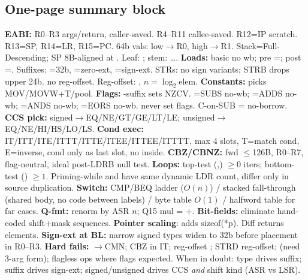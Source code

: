 \subsection{One-page summary block}
\textbf{EABI:} R0--R3 args/return, caller-saved. R4--R11 callee-saved. R12=IP scratch. R13=SP, R14=LR, R15=PC. 64b vals: low$\to$R0, high$\to$R1. Stack=Full-Descending; SP 8B-aligned at . Leaf: ; stem: \dots{}. \textbf{Loads:} basic \asm{[Ra,\#k]} no wb; pre \asm{[Ra,\#k]!}=; post =. Suffixes: =32b, =zero-ext, =sign-ext. STRs: no sign variants; STRB drops upper 24b.  no reg-offset. Reg-offset: \asm{[Ra,Ri,LSL \#n]}, $n=\log_2$elem. \textbf{Constants:}  picks MOV/MOVW+T/pool. \textbf{Flags:} -suffix sets NZCV. =SUBS no-wb; =ADDS no-wb; =ANDS no-wb; =EORS no-wb.  never set flags. C-on-SUB = no-borrow. \textbf{CCS pick:} signed$\to$EQ/NE/GT/GE/LT/LE; unsigned$\to$EQ/NE/HI/HS/LO/LS. \textbf{Cond exec:} IT/ITT/ITE/ITTT/ITTE/ITEE/ITTEE/ITTTT, max 4 slots, T=match cond, E=inverse, cond  only as last slot, no  inside. \textbf{CBZ/CBNZ:} fwd $\le$126B, R0--R7, flag-neutral, ideal post-LDRB null test. \textbf{Loops:} top-test (,) $\ge 0$ iters; bottom-test () $\ge 1$. Priming-while and  have same dynamic LDR count, differ only in source duplication. \textbf{Switch:} CMP/BEQ ladder ($O(n)$) / stacked fall-through (shared body, no code between labels) /  byte table $O(1)$ /  halfword table for far cases. \textbf{Q-fmt:} renorm by ASR $n$; Q15 mul = +. \textbf{Bit-fields:}  eliminate hand-coded shift+mask sequences. \textbf{Pointer scaling}:  adds sizeof(*p). Diff returns elements. \textbf{Sign-ext at BL:} narrow signed types widen to 32b before placement in R0--R3. \textbf{Hard fails:} $\to$CMN; CBZ in IT; reg-offset \asm{!}; STRD reg-offset;  (need 3-arg form); flagless ops where flags expected. When in doubt: type drives suffix; suffix drives sign-ext; signed/unsigned drives CCS \emph{and} shift kind (ASR vs LSR).
